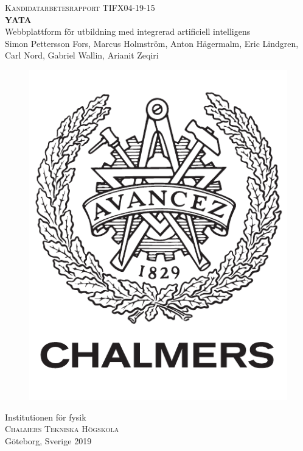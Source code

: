 \thispagestyle{empty}
\begin{center}
	\textsc{\large Kandidatarbetesrapport TIFX04-19-15}\\[4cm]		%
	\textbf{\Large YATA} \\[1cm]
	{\large Webbplattform för utbildning med integrerad artificiell intelligens}\\[1cm]
	{\large Simon Pettersson Fors, Marcus Holmström, Anton Hägermalm, Eric Lindgren, Carl Nord, Gabriel Wallin, Arianit Zeqiri}
	
	\vfill	
	\begin{figure}[H]
	\centering
	\includegraphics[width=0.2\pdfpagewidth]{images/frontpage/logo_swe.pdf} \\	
	\end{figure}	\vspace{5mm}	
	Institutionen för fysik \\
	\textsc{Chalmers Tekniska Högskola} \\
	Göteborg, Sverige 2019 \\
\end{center}

